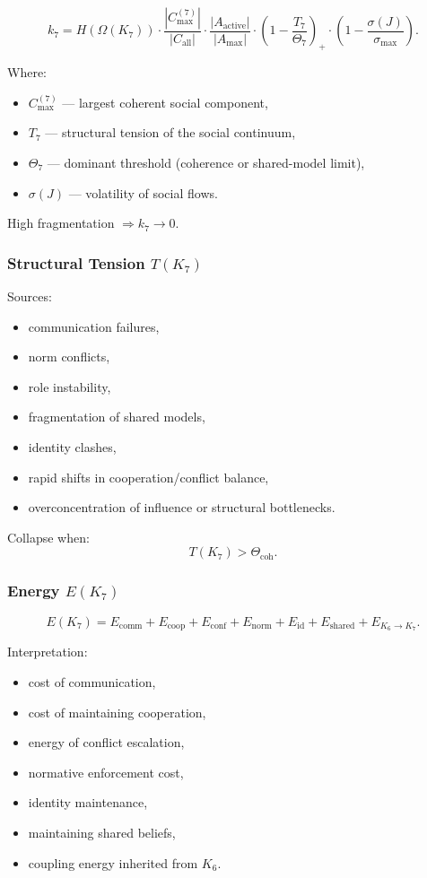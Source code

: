 \[
k_7 =
H(\Omega(K_7))
\cdot
\frac{|C_{\max}^{(7)}|}{|C_{\mathrm{all}}|}
\cdot
\frac{|A_{\mathrm{active}}|}{|A_{\max}|}
\cdot
\left(1-\frac{T_7}{\Theta_7}\right)_+
\cdot
\left(1-\frac{\sigma(J)}{\sigma_{\max}}\right).
\]

Where:
\begin{itemize}
    \item $C_{\max}^{(7)}$ — largest coherent social component,
    \item $T_7$ — structural tension of the social continuum,
    \item $\Theta_7$ — dominant threshold (coherence or shared-model limit),
    \item $\sigma(J)$ — volatility of social flows.
\end{itemize}

High fragmentation $\Rightarrow k_7\to 0$.

\subsubsection{Structural Tension \texorpdfstring{$T(K_7)$}{T(K_7)}}

Sources:
\begin{itemize}
    \item communication failures,
    \item norm conflicts,
    \item role instability,
    \item fragmentation of shared models,
    \item identity clashes,
    \item rapid shifts in cooperation/conflict balance,
    \item overconcentration of influence or structural bottlenecks.
\end{itemize}

Collapse when:
\[
T(K_7) > \Theta_{\mathrm{coh}}.
\]

\subsubsection{Energy \texorpdfstring{$E(K_7)$}{E(K_7)}}

\[
E(K_7)
=
E_{\mathrm{comm}}
+ E_{\mathrm{coop}}
+ E_{\mathrm{conf}}
+ E_{\mathrm{norm}}
+ E_{\mathrm{id}}
+ E_{\mathrm{shared}}
+ E_{K_6\to K_7}.
\]

Interpretation:
\begin{itemize}
    \item cost of communication,
    \item cost of maintaining cooperation,
    \item energy of conflict escalation,
    \item normative enforcement cost,
    \item identity maintenance,
    \item maintaining shared beliefs,
    \item coupling energy inherited from $K_6$.
\end{itemize}

